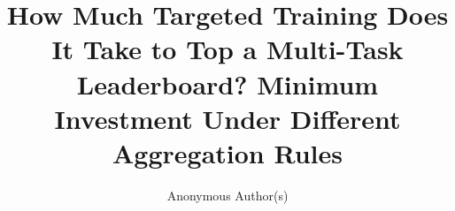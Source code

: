 \documentclass{article}
\title{How Much Targeted Training Does It Take to Top a Multi-Task Leaderboard? Minimum Investment Under Different Aggregation Rules}
\author{Anonymous Author(s)}
\begin{document}
\maketitle









{\small}

\appendix



\end{document}
